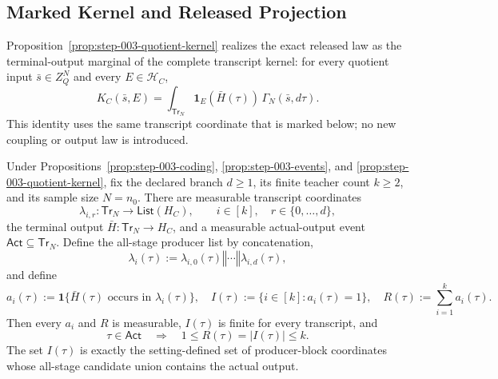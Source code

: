 \subsection{Marked Kernel and Released Projection}\label{app:step_004}

Proposition~\ref{prop:step-003-quotient-kernel} realizes the exact released
law as the terminal-output marginal of the complete transcript kernel: for
every quotient input \(\bar s\in Z_Q^N\) and every
\(E\in\mathcal H_C\),
\[
 K_C(\bar s,E)
 =\int_{\mathsf{Tr}_N}
   \mathbf1_E(\bar H(\tau))\,\Gamma_N(\bar s,d\tau).
\tag{1}
\]
This identity uses the same transcript coordinate that is marked below; no
new coupling or output law is introduced.


 \begin{lemma}\label{lem:step-004-occurrence}
Under  Propositions~\ref{prop:step-003-coding},
\ref{prop:step-003-events}, and
\ref{prop:step-003-quotient-kernel}, fix the declared branch \(d\geq1\),
its finite teacher count \(k\geq2\), and its sample size \(N=n_0\). There
are measurable transcript coordinates
\[
\lambda_{i,r}:\mathsf{Tr}_N\longrightarrow
\mathsf{List}(H_C),
\qquad i\in[k],\quad r\in\{0,\ldots,d\},
\tag{2}
\]
the terminal output \(\bar H:\mathsf{Tr}_N\to H_C\), and a measurable
actual-output event \(\mathsf{Act}\subseteq\mathsf{Tr}_N\). Define the
all-stage producer list by concatenation,
\[
\lambda_i(\tau)
:=\lambda_{i,0}(\tau)\mathbin{\Vert}\cdots
  \mathbin{\Vert}\lambda_{i,d}(\tau),
\tag{3}
\]
and define
\[
a_i(\tau):=
\mathbf1\{\bar H(\tau)\text{ occurs in }\lambda_i(\tau)\},
\quad
I(\tau):=\{i\in[k]:a_i(\tau)=1\},
\quad
R(\tau):=\sum_{i=1}^k a_i(\tau).
\tag{4}
\]
Then every \(a_i\) and \(R\) is measurable, \(I(\tau)\) is finite for
every transcript, and
\[
\tau\in\mathsf{Act}\quad\Longrightarrow\quad
1\leq R(\tau)=|I(\tau)|\leq k.
\tag{5}
\]
The set \(I(\tau)\) is exactly the setting-defined set of producer-block
coordinates whose all-stage candidate union contains the actual output.


\end{lemma}


